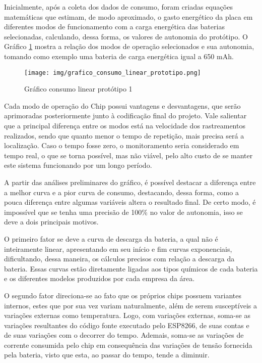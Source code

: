 {
Inicialmente, após a coleta dos dados de consumo, foram criadas equações matemáticas que estimam, de modo aproximado, o gasto energético da placa em diferentes modos de funcionamento com a carga energética das baterias selecionadas, calculando, dessa forma, os valores de autonomia do protótipo. O Gráfico \ref{grafico:grafico_consumo_linear} mostra a relação dos modos de operação selecionados e sua autonomia, tomando como exemplo uma bateria de carga energética igual a 650 mAh. 
}

\begin{figure}[htp]
    \centering
    \texttt{[image: img/grafico\_consumo\_linear\_prototipo.png]}
    \caption{Gráfico consumo linear protótipo 1}
    \label{grafico:grafico_consumo_linear}
\end{figure}

{
Cada modo de operação do Chip possui vantagens e desvantagens, que serão aprimoradas posteriormente junto à codificação final do projeto. Vale salientar que a principal diferença entre os modos está na velocidade dos rastreamentos realizados, sendo que quanto menor o tempo de repetição, mais precisa será a localização. Caso o tempo fosse zero, o monitoramento seria considerado em tempo real, o que se torna possível, mas não viável, pelo alto custo de se manter este sistema funcionando por um longo período.
}

{
A partir das análises preliminares do gráfico, é possível destacar a diferença entre a melhor curva e a pior curva de consumo, destacando, dessa forma, como a pouca diferença entre algumas variáveis altera o resultado final. De certo modo, é impossível que se tenha uma precisão de 100\% no valor de autonomia, isso se deve a dois principais motivos. 
}

{
O primeiro fator se deve a curva de descarga da bateria, a qual não é inteiramente linear, apresentando em seu início e fim curvas exponenciais, dificultando, dessa maneira, os cálculos precisos com relação a descarga da bateria. Essas curvas estão diretamente ligadas aos tipos químicos de cada bateria e os diferentes modelos produzidos por cada empresa da área.
}

{
O segundo fator direciona-se ao fato que os próprios chips possuem variantes internos, estes que por sua vez variam naturalmente, além de serem susceptíveis a variações externas como temperatura. Logo, com variações externas, soma-se as variações resultantes do código fonte executado pelo ESP8266, de suas contas e de suas variações com o decorrer do tempo. Ademais, soma-se as variações de corrente consumida pelo chip em consequência das variações de tensão fornecida pela bateria, visto que esta, ao passar do tempo, tende a diminuir.
}

